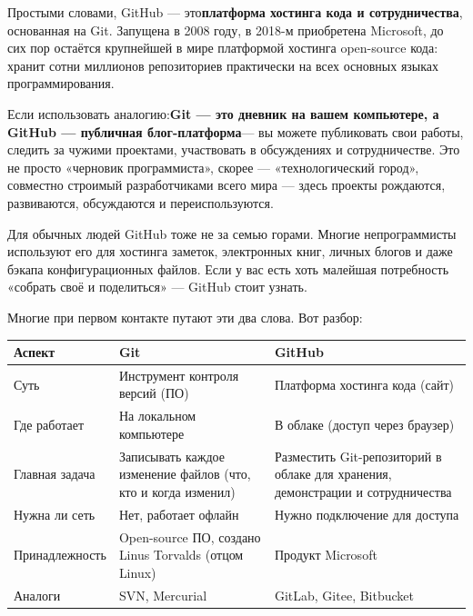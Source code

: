 


Простыми словами, GitHub — это\textbf{платформа хостинга кода и сотрудничества}, основанная на Git. Запущена в 2008 году, в 2018-м приобретена Microsoft, до сих пор остаётся крупнейшей в мире платформой хостинга open-source кода: хранит сотни миллионов репозиториев практически на всех основных языках программирования.

Если использовать аналогию:\textbf{Git — это дневник на вашем компьютере, а GitHub — публичная блог-платформа}— вы можете публиковать свои работы, следить за чужими проектами, участвовать в обсуждениях и сотрудничестве. Это не просто «черновик программиста», скорее — «технологический город», совместно строимый разработчиками всего мира — здесь проекты рождаются, развиваются, обсуждаются и переиспользуются.

Для обычных людей GitHub тоже не за семью горами. Многие непрограммисты используют его для хостинга заметок, электронных книг, личных блогов и даже бэкапа конфигурационных файлов. Если у вас есть хоть малейшая потребность «собрать своё и поделиться» — GitHub стоит узнать.


Многие при первом контакте путают эти два слова. Вот разбор:

\begin{center}
\begin{tabularx}{\linewidth}{|X|X|X|}
\hline
\textbf{Аспект} & \textbf{Git} & \textbf{GitHub} \tabularnewline
\hline
Суть & Инструмент контроля версий (ПО) & Платформа хостинга кода (сайт) \tabularnewline
Где работает & На локальном компьютере & В облаке (доступ через браузер) \tabularnewline
Главная задача & Записывать каждое изменение файлов (что, кто и когда изменил) & Разместить Git-репозиторий в облаке для хранения, демонстрации и сотрудничества \tabularnewline
Нужна ли сеть & Нет, работает офлайн & Нужно подключение для доступа \tabularnewline
Принадлежность & Open-source ПО, создано Linus Torvalds (отцом Linux) & Продукт Microsoft \tabularnewline
Аналоги & SVN, Mercurial & GitLab, Gitee, Bitbucket \tabularnewline
\hline
\end{tabularx}
\end{center}

